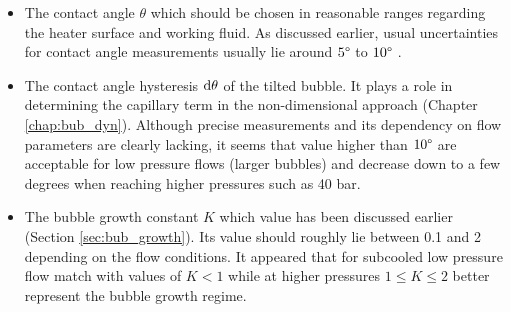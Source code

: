 \begin{itemize}
\item The contact angle $\theta$ which should be chosen in reasonable ranges regarding the heater surface and working fluid. As discussed earlier, usual uncertainties for contact angle measurements usually lie around $5\degree$ to $10\degree$ \cite{guan_bubble_2015}.

\item The contact angle hysteresis $\mathrm{d}\theta$ of the tilted bubble. It plays a role in determining the capillary term in the non-dimensional approach (Chapter \ref{chap:bub_dyn}). Although precise measurements and its dependency on flow parameters are clearly lacking, it seems that value higher than $10 \degree$ are acceptable for low pressure flows (larger bubbles) and decrease down to a few degrees when reaching higher pressures such as 40 bar.

\item The bubble growth constant $K$ which value has been discussed earlier (Section \ref{sec:bub_growth}). Its value should roughly lie between 0.1 and 2 depending on the flow conditions. It appeared that for subcooled low pressure flow match with values of $K < 1$ while at higher pressures $1 \leq K \leq 2$ better represent the bubble growth regime.
\end{itemize}




